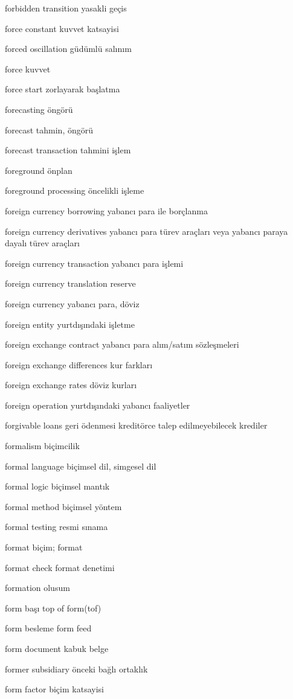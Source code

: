 \documentclass[12pt,fleqn]{article}\usepackage{../../common}
\begin{document}
forbidden transition yasakli geçis

force constant kuvvet katsayisi

forced oscillation güdümlü salınım

force kuvvet

force start zorlayarak başlatma

forecasting öngörü

forecast tahmin, öngörü

forecast transaction tahmini işlem

foreground önplan

foreground processing öncelikli işleme

foreign currency borrowing yabancı para ile borçlanma

foreign currency derivatives yabancı para türev araçları veya yabancı paraya dayalı türev araçları

foreign currency transaction yabancı para işlemi

foreign currency translation reserve

foreign currency yabancı para, döviz

foreign entity yurtdışındaki işletme

foreign exchange contract yabancı para alım/satım sözleşmeleri

foreign exchange differences kur farkları

foreign exchange rates döviz kurları

foreign operation yurtdışındaki yabancı faaliyetler

forgivable loans geri ödenmesi kreditörce talep edilmeyebilecek krediler

formalism biçimcilik

formal language biçimsel dil, simgesel dil

formal logic biçimsel mantık

formal method biçimsel yöntem

formal testing resmi sınama

format biçim; format

format check format denetimi

formation olusum

form başı top of form(tof)

form besleme form feed

form document kabuk belge

former subsidiary önceki bağlı ortaklık

form factor biçim katsayisi
\end{document}
